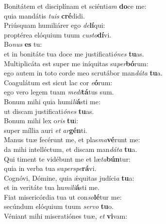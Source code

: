 \evenverse Bonitátem et disciplínam et sciénti\textit{am} \textbf{do}ce me:~\*\\
\evenverse quia mandátis \textit{tu}\textit{is} \textbf{cré}didi.\\
\oddverse Priúsquam humiliárer ego \textit{de}\textbf{lí}qui:~\*\\
\oddverse proptérea elóquium tuum \textit{cu}\textit{sto}\textbf{dí}vi.\\
\evenverse Bo\textit{nus} \textbf{es} tu:~\*\\
\evenverse et in bonitáte tua doce me justificati\textit{ó}\textit{nes} \textbf{tu}as.\\
\oddverse Multiplicáta est super me iníquitas su\textit{per}\textbf{bó}rum:~\*\\
\oddverse ego autem in toto corde meo scrutábor man\textit{dá}\textit{ta} \textbf{tu}a.\\
\evenverse Coagulátum est sicut lac cor \textit{e}\textbf{ó}rum:~\*\\
\evenverse ego vero legem tuam \textit{me}\textit{di}\textbf{tá}tus sum.\\
\oddverse Bonum mihi quia humi\textit{li}\textbf{á}sti me:~\*\\
\oddverse ut discam justificati\textit{ó}\textit{nes} \textbf{tu}as.\\
\evenverse Bonum mihi lex o\textit{ris} \textbf{tu}i:~\*\\
\evenverse super míllia auri \textit{et} \textit{ar}\textbf{gén}ti.\\
\oddverse Manus tuæ fecérunt me, et plas\textit{ma}\textbf{vé}runt me:~\*\\
\oddverse da mihi intelléctum, et discam man\textit{dá}\textit{ta} \textbf{tu}a.\\
\evenverse Qui timent te vidébunt me et læ\textit{ta}\textbf{bún}tur:~\*\\
\evenverse quia in verba tua su\textit{per}\textit{spe}\textbf{rá}vi.\\
\oddverse Cognóvi, Dómine, quia ǽquitas judíci\textit{a} \textbf{tu}a:~\*\\
\oddverse et in veritáte tua hu\textit{mi}\textit{li}\textbf{á}sti me.\\
\evenverse Fiat misericórdia tua ut con\textit{so}\textbf{lé}tur me:~\*\\
\evenverse secúndum elóquium tuum \textit{ser}\textit{vo} \textbf{tu}o.\\
\oddverse Véniant mihi miseratiónes tuæ, \textit{et} \textbf{vi}vam:~\*\\
